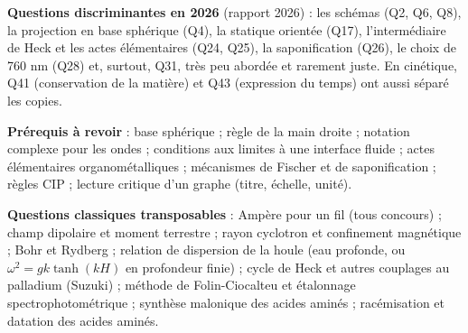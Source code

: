 \documentclass[11pt,a4paper]{article}
\begin{document}
\textbf{Questions discriminantes en 2026} (rapport 2026) : les schémas (Q2, Q6, Q8), la projection en base sphérique (Q4), la statique orientée (Q17), l'intermédiaire de Heck et les actes élémentaires (Q24, Q25), la saponification (Q26), le choix de 760 nm (Q28) et, surtout, Q31, très peu abordée et rarement juste. En cinétique, Q41 (conservation de la matière) et Q43 (expression du temps) ont aussi séparé les copies.

\textbf{Prérequis à revoir} : base sphérique ; règle de la main droite ; notation complexe pour les ondes ; conditions aux limites à une interface fluide ; actes élémentaires organométalliques ; mécanismes de Fischer et de saponification ; règles CIP ; lecture critique d'un graphe (titre, échelle, unité).

\textbf{Questions classiques transposables} : Ampère pour un fil (tous concours) ; champ dipolaire et moment terrestre ; rayon cyclotron et confinement magnétique ; Bohr et Rydberg ; relation de dispersion de la houle (eau profonde, ou \(\omega^2=gk\tanh(kH)\) en profondeur finie) ; cycle de Heck et autres couplages au palladium (Suzuki) ; méthode de Folin-Ciocalteu et étalonnage spectrophotométrique ; synthèse malonique des acides aminés ; racémisation et datation des acides aminés.
\end{document}
